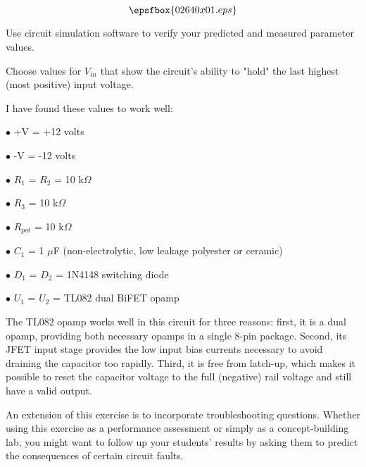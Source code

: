 

$$\epsfbox{02640x01.eps}$$

\vfil \eject






Use circuit simulation software to verify your predicted and measured parameter values.







Choose values for $V_{in}$ that show the circuit's ability to "hold" the last highest (most positive) input voltage.

I have found these values to work well:

\medskip
\goodbreak
\item{$\bullet$} +V = +12 volts
\item{$\bullet$} -V = -12 volts
\item{$\bullet$} $R_1$ = $R_2$ = 10 k$\Omega$
\item{$\bullet$} $R_3$ = 10 k$\Omega$
\item{$\bullet$} $R_{pot}$ = 10 k$\Omega$
\item{$\bullet$} $C_1$ = 1 $\mu$F (non-electrolytic, low leakage polyester or ceramic)
\item{$\bullet$} $D_1$ = $D_2$ = 1N4148 switching diode
\item{$\bullet$} $U_1$ = $U_2$ = TL082 dual BiFET opamp
\medskip

The TL082 opamp works well in this circuit for three reasons: first, it is a dual opamp, providing both necessary opamps in a single 8-pin package.  Second, its JFET input stage provides the low input bias currents necessary to avoid draining the capacitor too rapidly.  Third, it is free from latch-up, which makes it possible to reset the capacitor voltage to the full (negative) rail voltage and still have a valid output.

An extension of this exercise is to incorporate troubleshooting questions.  Whether using this exercise as a performance assessment or simply as a concept-building lab, you might want to follow up your students' results by asking them to predict the consequences of certain circuit faults.




